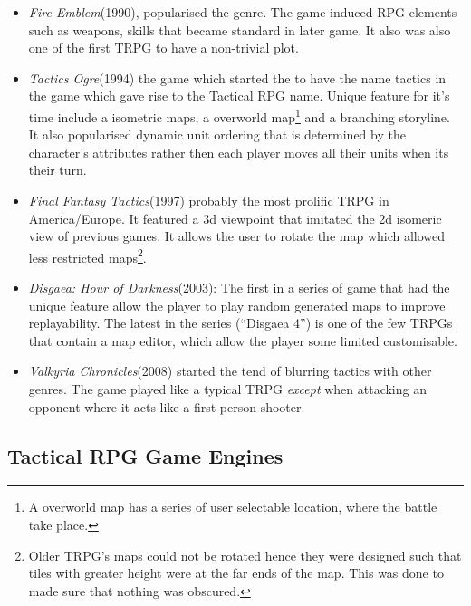 \begin{itemize}
	
	\item \emph{Fire Emblem}(1990), popularised the genre. The game induced RPG elements such as weapons, skills that became standard in later game. It also was also one of the first TRPG to have a non-trivial plot. 

	\item \emph{Tactics Ogre}(1994) the game which started the to have the name tactics in the game  which gave rise to the Tactical RPG name\footnotemark[\value{footnote}]\cite{tactics}. Unique feature for it's time include a isometric maps, a overworld map\footnote{A overworld map has a series of user selectable location, where the battle take place.} and  a branching storyline. It also popularised dynamic unit ordering that is determined by the character's attributes rather then each player moves all their units when its their turn.

	\item \emph{Final Fantasy Tactics}(1997) probably the most prolific TRPG in America/Europe. It featured a 3d viewpoint that imitated  the 2d isomeric view of previous games.  It allows the user to rotate the map which allowed less restricted maps\footnote{Older TRPG's maps could not be rotated hence they were designed such that tiles with greater height were at the far ends of the map. This was done to made sure that nothing was obscured.}.
	
	\item  \emph{Disgaea: Hour of Darkness}(2003): The first in a series of game that had the unique feature allow the player to play random generated maps to improve replayability. The latest in the series (``Disgaea 4'') is one of the few TRPGs that contain a map editor, which allow the player some limited customisable. 


	\item  \emph{Valkyria Chronicles}(2008) started the tend of blurring tactics with other genres. The game played like a typical TRPG \emph{except} when attacking an opponent where it acts like a first person shooter.

\end{itemize}


\subsection{Tactical RPG Game Engines}
\label{sub:tactical_rpg_game_engines}

